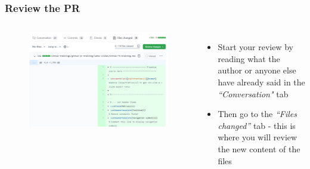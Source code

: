 \documentclass[aspectratio=169]{beamer} %
\begin{document}
\begin{frame}
	\frametitle{Review the PR}
	\begin{columns}[c]

		\vspace{-.75cm}
		\begin{figure}
			\centering
			\includegraphics[width=\textwidth]{./img/review-1.png}
		\end{figure}

		\begin{itemize}
			\setlength\itemsep{2em}
			\item Start your review by reading what the author or anyone else
			have already said in the \textit{``Conversation"} tab
			\item Then go to the \textit{``Files changed''} tab
			- this is where you will review the new content of the files
		\end{itemize}

	\end{columns}
\end{frame}
\end{document}
